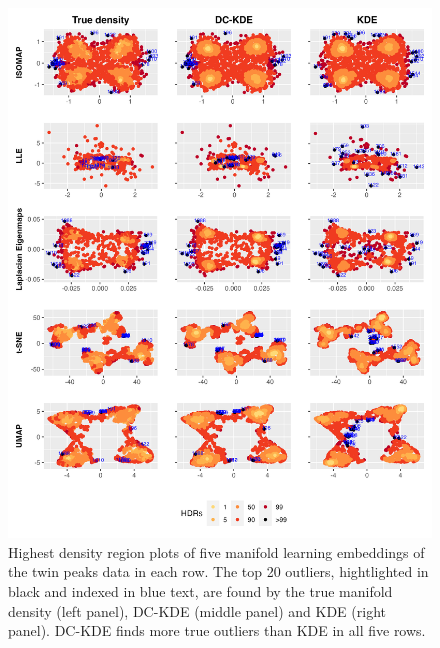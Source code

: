 \documentclass[11pt,a4paper,]{article}
\begin{document}
\begin{figure}

{\centering \includegraphics[width=0.95\linewidth]{figures/Twin Peak2000_5levels_outliers_comparison_5ml_r0_5} 

}

\caption{Highest density region plots of five manifold learning embeddings of the twin peaks data in each row. The top 20 outliers, hightlighted in black and indexed in blue text, are found by the true manifold density (left panel), DC-KDE (middle panel) and KDE (right panel). DC-KDE finds more true outliers than KDE in all five rows.}\label{fig:tpoutliers}
\end{figure}
\end{document}
